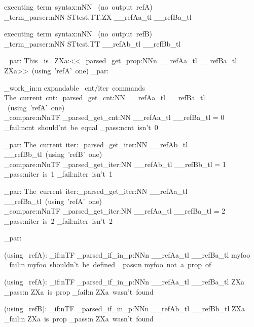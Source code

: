 \documentclass{article}
\begin{document}
executing~term~syntax:nNN ~(no~output~refA)\\
\starray_term_parser:nNN {STtest.TT.ZX} \__refAa_tl \__refBa_tl

executing~term~syntax:nNN ~(no~output~refB)\\
\starray_term_parser:nNN {STtest.TT} \__refAb_tl \__refBb_tl


\sttests_par:
This~ is~ ZXa:<<\starray_parsed_get_prop:NNn \__refAa_tl \__refBa_tl {ZXa}>>~(using~'refA'~one)
\sttests_par:

\sttests_work_in:n {expandable~ cnt/iter~commands}
The~current~cnt:\starray_parsed_get_cnt:NN \__refAa_tl \__refBa_tl ~(using~'refA'~one)\\

\int_compare:nNnTF {\starray_parsed_get_cnt:NN \__refAa_tl \__refBa_tl} = {0}
  {\sttests_fail:n{cnt~should'nt~be~equal}} 
  {\sttests_pass:n{cnt~isn't~0}}
  
\sttests_par:
The~current~iter:\starray_parsed_get_iter:NN \__refAb_tl \__refBb_tl~(using~'refB'~one)\\

\int_compare:nNnTF {\starray_parsed_get_iter:NN \__refAb_tl \__refBb_tl} = {1}
  {\sttests_pass:n{iter~is~1}} 
  {\sttests_fail:n{iter~isn't~1}}

\sttests_par:
The~current~iter:\starray_parsed_get_iter:NN \__refAa_tl \__refBa_tl~(using~'refA'~one)\\

\int_compare:nNnTF {\starray_parsed_get_iter:NN \__refAa_tl \__refBa_tl} = {2}
  {\sttests_pass:n{iter~is~2}} 
  {\sttests_fail:n{iter~isn't~2}}


\sttests_par:

(using~ refA):
\bool_if:nTF { \starray_parsed_if_in_p:NNn \__refAa_tl \__refBa_tl {myfoo} }
  {  \sttests_fail:n {myfoo~shouldn't~be~defined } }
  {   \sttests_pass:n {myfoo~not~a~prop~of } }

(using~ refA):
\bool_if:nTF { \starray_parsed_if_in_p:NNn \__refAa_tl \__refBa_tl {ZXa} }
  {  \sttests_pass:n {ZXa~is~prop } }
  {   \sttests_fail:n {ZXa~wasn't~found } }

(using~ refB):
\bool_if:nTF { \starray_parsed_if_in_p:NNn \__refAb_tl \__refBb_tl {ZXa} }
  {  \sttests_fail:n {ZXa~is~prop } }
  {   \sttests_pass:n {ZXa~wasn't~found } }
\end{document}
